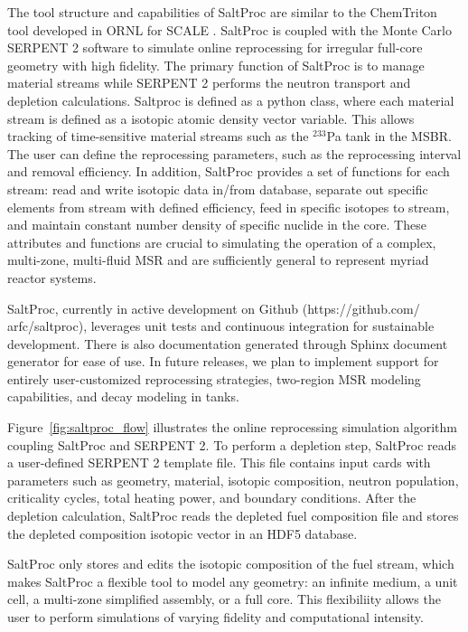 The tool structure and capabilities of SaltProc are similar to the ChemTriton tool 
developed in \gls{ORNL} for SCALE \cite{powers_new_2013}. SaltProc is coupled 
with the Monte Carlo SERPENT 2
software to simulate online reprocessing for irregular full-core 
geometry with high fidelity.  The primary function of SaltProc is to 
manage material streams while SERPENT 2 performs the neutron 
transport and depletion calculations. Saltproc is defined as a python class, where 
each material stream is defined as a isotopic atomic density
vector variable. This allows tracking of time-sensitive material streams such 
as the 	$^{233}$Pa tank in the \gls{MSBR}. The user can define the reprocessing 
parameters, such as the reprocessing interval and removal efficiency.  In 
addition, SaltProc provides a set of functions for each stream: read and write 
isotopic data in/from database, separate out specific elements from stream with 
defined efficiency, feed in specific isotopes to stream, and maintain constant 
number density of specific nuclide in the core. These attributes and functions 
are crucial to simulating the operation of a complex, multi-zone, multi-fluid 
\gls{MSR} and are sufficiently general to represent myriad reactor systems.

SaltProc, currently in active development on Github (https://github.com/ 
arfc/saltproc), leverages unit tests and continuous integration for 
sustainable development. There is also documentation
generated through Sphinx document generator for ease of use. In future 
releases, we plan to 
implement
support for entirely user-customized reprocessing strategies, two-region \gls{MSR} modeling 
capabilities, and decay modeling in tanks.

Figure~\ref{fig:saltproc_flow} illustrates the  online reprocessing simulation 
algorithm coupling SaltProc and SERPENT 2. To perform a depletion step, 
SaltProc reads a user-defined SERPENT 2 template file. This file contains input 
cards with parameters such as geometry, material, isotopic composition, neutron 
population, criticality cycles, total heating power, and boundary conditions.  
After the depletion calculation, SaltProc reads the depleted fuel composition 
file and stores the depleted composition isotopic vector in 
an HDF5 database. 

SaltProc only stores and edits the isotopic composition of 
the fuel stream, which makes SaltProc a flexible tool to model any geometry: an 
infinite medium, a unit cell, a multi-zone simplified assembly, or a full core.
This flexibiliity allows the user to perform simulations of varying fidelity 
and computational intensity.

